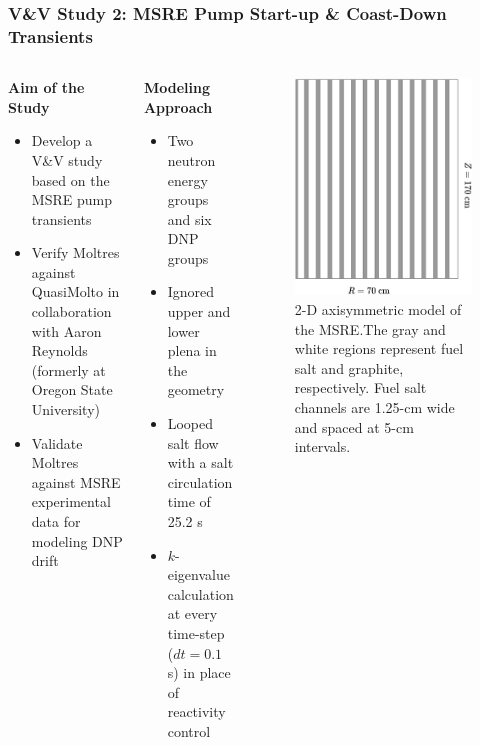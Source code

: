 \begin{frame}
  \frametitle{V\&V Study 2: MSRE Pump Start-up \& Coast-Down Transients}
  \begin{columns}
    \column{6.5cm}
    \begin{block}{\textbf{Aim of the Study}}
      \begin{itemize}
         \item Develop a V\&V study based on the MSRE pump transients
         \item Verify Moltres against QuasiMolto in collaboration with Aaron Reynolds
           (formerly at Oregon State University)
         \item Validate Moltres against MSRE experimental data for modeling \gls{DNP} drift
       \end{itemize}
    \end{block}
    \begin{block}{\textbf{Modeling Approach}}
      \begin{itemize}
        \item Two neutron energy groups and six DNP groups
        \item Ignored upper and lower plena in the geometry
        \item Looped salt flow with a salt circulation time of 25.2 s
        \item $k$-eigenvalue calculation at every time-step ($dt=0.1$ s) in place of reactivity control
      \end{itemize}
    \end{block}
    \column{4.5cm}
    \begin{figure}[htb]
      \centering
      \includegraphics[width=0.8\columnwidth]{images/msre-2d}
      \caption{2-D axisymmetric model of the \gls{MSRE}.The gray and white regions represent fuel salt
      and graphite, respectively. Fuel salt channels are 1.25-cm wide and spaced at 5-cm intervals.}
      \label{fig:pump-geom}
    \end{figure}
  \end{columns}
\end{frame}


